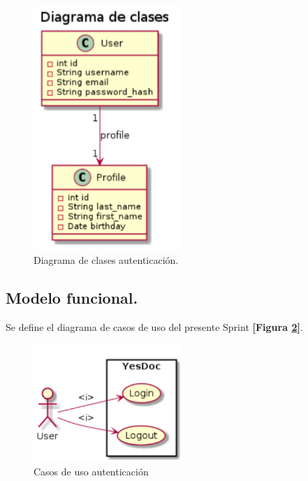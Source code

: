\documentclass[a4paper,12pt]{article}
\begin{document}
\begin{figure}[h]
        \centering
        \includegraphics[width=0.5\textwidth]{img/clases_auth}
        \caption{Diagrama de clases autenticación.}
		\label{4-clase_autenticacion}
    \end{figure}

\subsection{ Modelo funcional.} 
Se define el diagrama de casos de uso del presente Sprint \textbf{[Figura \ref{4-cu_autenticacion}]}.

    \begin{figure}[h]
        \centering
        \includegraphics[width=0.5\textwidth]{img/cu_autenticacion}
        \caption{Casos de uso autenticación}
		\label{4-cu_autenticacion}
    \end{figure}
\end{document}

